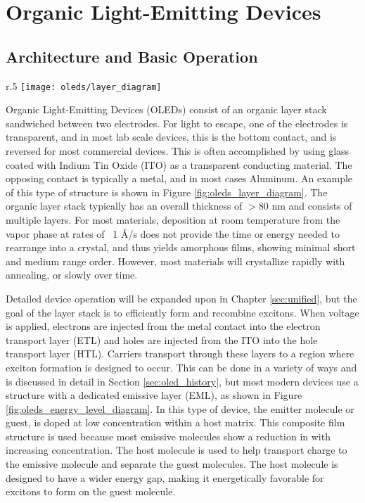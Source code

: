 \documentclass[../thesis.tex]{subfiles}
\begin{document}
\chapter{Organic Light-Emitting Devices}\label{sec:oleds}

\section{Architecture and Basic Operation} \label{sec:oled_operation}

\begin{wrapfigure}{r}{.5\textwidth}
\centering
\texttt{[image: oleds/layer\_diagram]}
\caption{Basic layer diagram for OLED devices. TCO is a transparent conducting oxide.}
\label{fig:oleds_layer_diagram}
\end{wrapfigure}

Organic Light-Emitting Devices (OLEDs) consist of an organic layer stack sandwiched between two electrodes.
For light to escape, one of the electrodes is transparent, and in most lab scale devices, this is the bottom contact, and is reversed for most commercial devices.
This is often accomplished by using glass coated with Indium Tin Oxide (ITO) as a transparent conducting material.
The opposing contact is typically a metal, and in most cases Aluminum.
An example of this type of structure is shown in Figure \ref{fig:oleds_layer_diagram}.
The organic layer stack typically has an overall thickness of $>$80 nm and consists of multiple layers.
For most materials, deposition at room temperature from the vapor phase at rates of ~1 \r{A}/s does not provide the time or energy needed to rearrange into a crystal, and thus yields amorphous films, showing minimal short and medium range order.\supercite{Tao2011,Shirota2007,Kafer2005,Maldonis2017,Maldonis2015,Zhang2017,Zhang2016a}
However, most materials will crystallize rapidly with annealing,\supercite{Fielitz2016} or slowly over time.\supercite{Scholz2015}

Detailed device operation will be expanded upon in Chapter \ref{sec:unified}, but the goal of the layer stack is to efficiently form and recombine excitons.
When voltage is applied, electrons are injected from the metal contact into the electron transport layer (ETL) and holes are injected from the ITO into the hole transport layer (HTL).
Carriers transport through these layers to a region where exciton formation is designed to occur.  
This can be done in a variety of ways and is discussed in detail in Section \ref{sec:oled_history}, but most modern devices use a structure with a dedicated emissive layer (EML), as shown in Figure \ref{fig:oleds_energy_level_diagram}.
In this type of device, the emitter molecule or guest, is doped at low concentration within a host matrix.\supercite{Baldo2000}
This composite film structure is used because most emissive molecules show a reduction in \pl with increasing concentration.\supercite{Turro1991a}
The host molecule is used to help transport charge to the emissive molecule and separate the guest molecules.
The host molecule is designed to have a wider energy gap, making it energetically favorable for excitons to form on the guest molecule.
\end{document}
